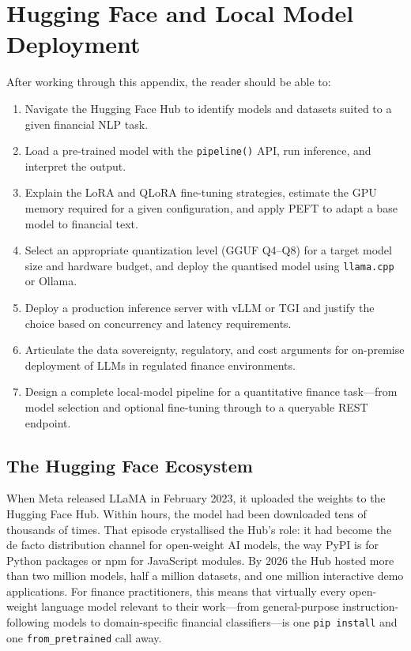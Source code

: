 \chapter{Hugging Face and Local Model Deployment}
\label{app:hf}

\begin{remark}
After working through this appendix, the reader should be able to:
\begin{enumerate}
  \item Navigate the Hugging Face Hub to identify models and datasets suited
        to a given financial NLP task.
  \item Load a pre-trained model with the \texttt{pipeline()} API, run
        inference, and interpret the output.
  \item Explain the LoRA and QLoRA fine-tuning strategies, estimate the
        GPU memory required for a given configuration, and apply PEFT to
        adapt a base model to financial text.
  \item Select an appropriate quantization level (GGUF Q4--Q8) for a target
        model size and hardware budget, and deploy the quantised model using
        \texttt{llama.cpp} or Ollama.
  \item Deploy a production inference server with vLLM or TGI and justify
        the choice based on concurrency and latency requirements.
  \item Articulate the data sovereignty, regulatory, and cost arguments for
        on-premise deployment of LLMs in regulated finance environments.
  \item Design a complete local-model pipeline for a quantitative finance
        task---from model selection and optional fine-tuning through to a
        queryable REST endpoint.
\end{enumerate}
\end{remark}

\section{The Hugging Face Ecosystem}
\label{app:hf:ecosystem}

\begin{context}
When Meta released LLaMA in February 2023, it uploaded the weights to the
Hugging Face Hub.  Within hours, the model had been downloaded tens of
thousands of times.  That episode crystallised the Hub's role: it had become
the de facto distribution channel for open-weight AI models, the way PyPI is
for Python packages or npm for JavaScript modules.  By 2026 the Hub hosted
more than two million models, half a million datasets, and one million
interactive demo applications.  For finance practitioners, this means that
virtually every open-weight language model relevant to their work---from
general-purpose instruction-following models to domain-specific financial
classifiers---is one \texttt{pip install} and one \texttt{from\_pretrained}
call away.
\end{context}


